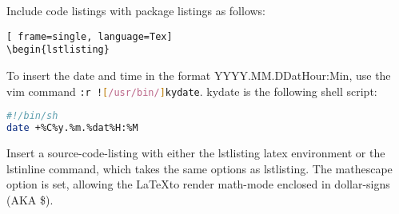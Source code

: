 Include code listings with package listings as follows:
\begin{lstlisting}[ frame=single, language=Tex]
\begin{lstlisting}
\end{lstlisting}
To insert the date and time in the format YYYY.MM.DDatHour:Min,
use the vim command \lstinline[language=bash]$:r ![/usr/bin/]kydate$. kydate is the following shell script:
\begin{lstlisting}[language=bash,frame=single]
#!/bin/sh
date +%C%y.%m.%dat%H:%M
\end{lstlisting}
Insert a source-code-listing with either the lstlisting latex environment or the lstinline command, which takes the same options as lstlisting. The mathescape option is set, allowing the \LaTeX to render math-mode enclosed in dollar-signs (AKA \$).
